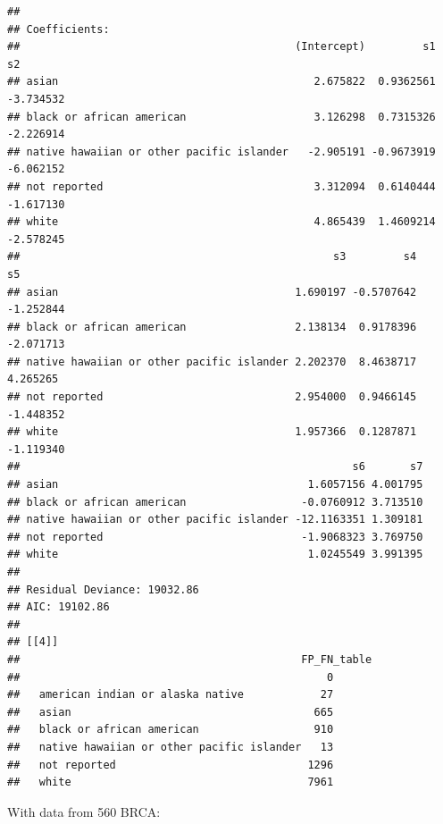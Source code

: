\documentclass{article}\usepackage[]{graphicx}\usepackage[]{color}
\makeatletter
\newenvironment{kframe}{%
 \def\at@end@of@kframe{}%
 \ifinner\ifhmode%
  \def\at@end@of@kframe{\end{minipage}}%
  \begin{minipage}{\columnwidth}%
 \fi\fi%
 \def\FrameCommand##1{\hskip\@totalleftmargin \hskip-\fboxsep
 \colorbox{shadecolor}{##1}\hskip-\fboxsep
     \hskip-\linewidth \hskip-\@totalleftmargin \hskip\columnwidth}%
 \MakeFramed {\advance\hsize-\width
   \@totalleftmargin\z@ \linewidth\hsize
   \@setminipage}}%
 {\par\unskip\endMakeFramed%
 \at@end@of@kframe}
\newenvironment{knitrout}{}{} %
\makeatother
\begin{document}
\begin{knitrout}
\begin{kframe}
\begin{verbatim}
## 
## Coefficients:
##                                           (Intercept)         s1        s2
## asian                                        2.675822  0.9362561 -3.734532
## black or african american                    3.126298  0.7315326 -2.226914
## native hawaiian or other pacific islander   -2.905191 -0.9673919 -6.062152
## not reported                                 3.312094  0.6140444 -1.617130
## white                                        4.865439  1.4609214 -2.578245
##                                                 s3         s4        s5
## asian                                     1.690197 -0.5707642 -1.252844
## black or african american                 2.138134  0.9178396 -2.071713
## native hawaiian or other pacific islander 2.202370  8.4638717  4.265265
## not reported                              2.954000  0.9466145 -1.448352
## white                                     1.957366  0.1287871 -1.119340
##                                                    s6       s7
## asian                                       1.6057156 4.001795
## black or african american                  -0.0760912 3.713510
## native hawaiian or other pacific islander -12.1163351 1.309181
## not reported                               -1.9068323 3.769750
## white                                       1.0245549 3.991395
## 
## Residual Deviance: 19032.86 
## AIC: 19102.86 
## 
## [[4]]
##                                            FP_FN_table
##                                                0
##   american indian or alaska native            27
##   asian                                      665
##   black or african american                  910
##   native hawaiian or other pacific islander   13
##   not reported                              1296
##   white                                     7961
\end{verbatim}
\end{kframe}
\end{knitrout}

With data from 560 BRCA:
\end{document}
